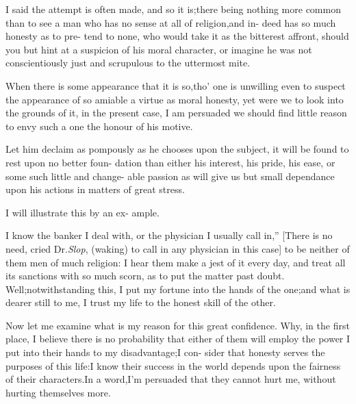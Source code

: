 \documentclass{article}
\begin{document}
\lqq I said the attempt is often made,\break
\lqq and so it is;\tsh there being nothing
\lqq more common than to see a man who\break
\lqq has no sense at all of religion,\tsk and in-\break
\lqq deed has so much honesty as to pre-\break
\lqq tend to none, who would take it as the\break
\lqq bitterest affront, should you but hint at\break
\lqq a suspicion of his moral character,\tsh\break
\lqq or imagine he was not conscientiously\break
\lqq just and scrupulous to the uttermost\break
\lqq mite.

\lqq When there is some appearance that\break
\lqq it is so,\tsk tho’ one is unwilling even to\break
\lqq suspect the appearance of so amiable a\break
\lqq virtue as moral honesty, yet were we\break
\lqq to look into the grounds of it, in the\break
\lqq present case, I am persuaded we should\break
\lqq find little reason to envy such a one\break
\lqq the honour of his motive.

\lqq Let him declaim as pompously as\break
\lqq he chooses upon the subject, it will
\lqq be found to rest upon no better foun-\break
\lqq dation than either his interest, his pride,\break
\lqq his ease, or some such little and change-\break
\lqq able passion as will give us but small\break
\lqq dependance upon his actions in matters\break
\lqq of great stress.

\lqq I will illustrate this by an ex-\break
\lqq ample.

\lqq I know the banker I deal with, or\break
\lqq the physician I usually call in,” [There\break
is no need, cried Dr.\@ \textit{Slop}, (waking) to call\break
in any physician in this case] \lqq to be\break
\lqq neither of them men of much religion:\break
\lqq I hear them make a jest of it every\break
\lqq day, and treat all its sanctions with so\break
\lqq much scorn, as to put the matter past\break
\lqq doubt.  Well;\tsk notwithstanding this,\break
\lqq I put my fortune into the hands of the\break
\lqq one;\tsk and what is dearer still to me,
\lqq I trust my life to the honest skill of\break
\lqq the other.

\lqq Now let me examine what is my\break
\lqq reason for this great confidence.\tsh\break
\lqq Why, in the first place, I believe there\break
\lqq is no probability that either of them\break
\lqq will employ the power I put into their\break
\lqq hands to my disadvantage;\tsk I con-\break
\lqq sider that honesty serves the purposes\break
\lqq of this life:\tsk I know their success in\break
\lqq the world depends upon the fairness of\break
\lqq their characters.\tsk In a word,\tsk I’m\break
\lqq persuaded that they cannot hurt me,\break
\lqq without hurting themselves more.
\end{document}
